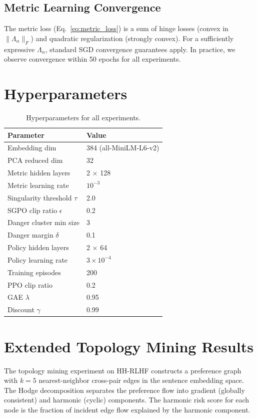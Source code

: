 \documentclass{article}
\begin{document}
\subsection{Metric Learning Convergence}

The metric loss (Eq.~\ref{eq:metric_loss}) is a sum of hinge losses (convex in $\|\Lambda_\alpha\|_F$) and quadratic regularization (strongly convex). For a sufficiently expressive $\Lambda_\alpha$, standard SGD convergence guarantees apply. In practice, we observe convergence within 50 epochs for all experiments.

\section{Hyperparameters}
\label{app:hyperparams}

\begin{table}[h]
\centering
\caption{Hyperparameters for all experiments.}
\begin{tabular}{@{}ll@{}}
\toprule
\textbf{Parameter} & \textbf{Value} \\
\midrule
Embedding dim & 384 (all-MiniLM-L6-v2) \\
PCA reduced dim & 32 \\
Metric hidden layers & 2 $\times$ 128 \\
Metric learning rate & $10^{-3}$ \\
Singularity threshold $\tau$ & 2.0 \\
SGPO clip ratio $\epsilon$ & 0.2 \\
Danger cluster min size & 3 \\
Danger margin $\delta$ & 0.1 \\
Policy hidden layers & 2 $\times$ 64 \\
Policy learning rate & $3 \times 10^{-4}$ \\
Training episodes & 200 \\
PPO clip ratio & 0.2 \\
GAE $\lambda$ & 0.95 \\
Discount $\gamma$ & 0.99 \\
\bottomrule
\end{tabular}
\end{table}

\section{Extended Topology Mining Results}
\label{app:topology}

The topology mining experiment on HH-RLHF constructs a preference graph with $k=5$ nearest-neighbor cross-pair edges in the sentence embedding space. The Hodge decomposition separates the preference flow into gradient (globally consistent) and harmonic (cyclic) components. The harmonic risk score for each node is the fraction of incident edge flow explained by the harmonic component.
\end{document}
